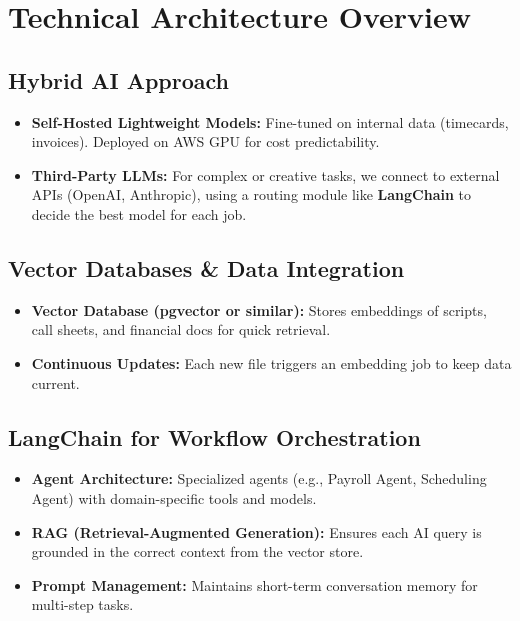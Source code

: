 \documentclass[11pt]{article}
\begin{document}
\section{Technical Architecture Overview}

\subsection{Hybrid AI Approach}
\begin{itemize}
    \item \textbf{Self-Hosted Lightweight Models:} Fine-tuned on internal data (timecards, invoices). Deployed on AWS GPU for cost predictability.
    \item \textbf{Third-Party LLMs:} For complex or creative tasks, we connect to external APIs (OpenAI, Anthropic), using a routing module like \textbf{LangChain} to decide the best model for each job.
\end{itemize}

\subsection{Vector Databases \& Data Integration}
\begin{itemize}
    \item \textbf{Vector Database (pgvector or similar):} Stores embeddings of scripts, call sheets, and financial docs for quick retrieval.
    \item \textbf{Continuous Updates:} Each new file triggers an embedding job to keep data current.
\end{itemize}

\subsection{LangChain for Workflow Orchestration}
\begin{itemize}
    \item \textbf{Agent Architecture:} Specialized agents (e.g., Payroll Agent, Scheduling Agent) with domain-specific tools and models.
    \item \textbf{RAG (Retrieval-Augmented Generation):} Ensures each AI query is grounded in the correct context from the vector store.
    \item \textbf{Prompt Management:} Maintains short-term conversation memory for multi-step tasks.
\end{itemize}
\end{document}
